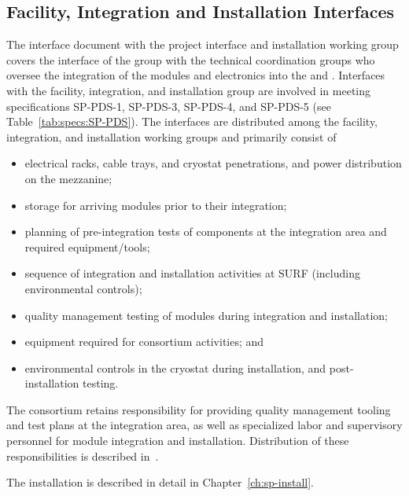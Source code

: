 \subsection{Facility, Integration and Installation Interfaces}

The interface document with the project interface and installation working group covers the interface of the  group with the technical coordination groups who oversee the integration of the  modules and electronics into the  and . Interfaces with the facility, integration, and installation group are involved in meeting specifications SP-PDS-1, SP-PDS-3, SP-PDS-4, and SP-PDS-5 (see Table~\ref{tab:specs:SP-PDS}).  The interfaces are distributed among the facility, integration, and installation working groups and primarily consist of
\begin{itemize}
    \item electrical racks, cable trays, and cryostat penetrations, and power distribution on the mezzanine;
    \item storage for arriving  modules prior to their integration;
    \item planning of pre-integration tests of  components at the integration area and required equipment/tools;
    \item sequence of integration and installation activities at SURF (including environmental controls);
    \item quality management testing of  modules during integration and installation;
    \item equipment required for  consortium activities; and
    \item environmental controls in the cryostat during installation, and post-installation testing.
\end{itemize}

The  consortium retains responsibility for providing quality management tooling and test plans at the integration area, as well as specialized labor and supervisory personnel for  module integration and installation. Distribution of these responsibilities is described in~. %

The installation is described in detail in Chapter~\ref{ch:sp-install}.


